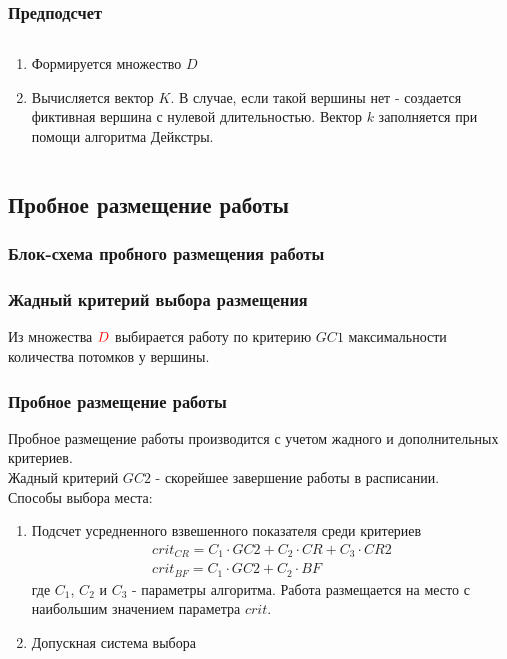 \begin{frame}
    \frametitle{Предподсчет}
    \begin{columns}
        \begin{column}{0.6\textwidth}
            \begin{enumerate}
                \item Формируется множество $D$
                \item Вычисляется вектор $K$. В случае, если такой вершины нет - создается фиктивная вершина с нулевой длительностью. Вектор $k$ заполняется при помощи алгоритма Дейкстры.
            \end{enumerate}
        \end{column}
        \begin{column}{0.4\textwidth}
        \end{column}
    \end{columns}
\end{frame}


\subsection{Пробное размещение работы}
\begin{frame}
    \frametitle{Блок-схема пробного размещения работы}
    {\tiny
    }
\end{frame}

\begin{frame}
    \frametitle{Жадный критерий выбора размещения}
    Из множества $\color{red}D$ выбирается работу по критерию $GC1$ максимальности количества потомков у вершины.
\end{frame}

\begin{frame}
    \frametitle{Пробное размещение работы}
    Пробное размещение работы производится с учетом  жадного и дополнительных критериев. \\
    Жадный критерий $GC2$ - скорейшее завершение работы в расписании. \\
    Способы выбора места:
    \begin{enumerate}
        \item Подсчет усредненного взвешенного показателя среди критериев \\
              \begin{gather*}
                  crit_{CR} = C_1 \cdot GC2 + C_2 \cdot CR + C_3 \cdot CR2 \\
                  crit_{BF} = C_1 \cdot GC2 + C_2 \cdot BF
              \end{gather*}
              где $C_1$, $C_2$ и $C_3$ - параметры алгоритма. Работа размещается на место с наибольшим значением параметра $crit$.
        \item Допускная система выбора
    \end{enumerate}
\end{frame}

